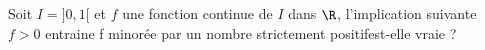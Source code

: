 Soit $I=]0,1[$ et $f$ une fonction continue de $I$ dans $\R$, l'implication suivante \newline
$f>0$ entraine f minor\'ee par un nombre strictement positif\newline est-elle vraie ? \bigskip